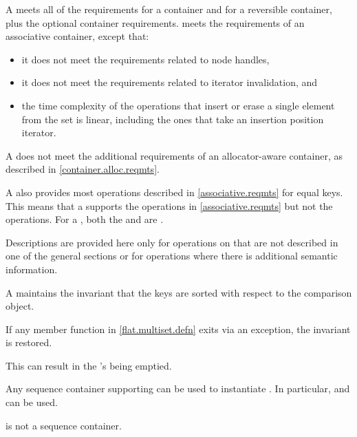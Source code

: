 \pnum
A  meets all of the requirements
for a container and
for a reversible container,
plus the optional container requirements.
 meets the requirements of
an associative container, except that:
\begin{itemize}
\item
it does not meet the requirements
related to node handles,
\item
it does not meet the requirements related to iterator invalidation, and
\item
the time complexity of the operations
that insert or erase a single element from the
set is linear,
including the ones that take an insertion position iterator.
\end{itemize}
\begin{note}
A  does not meet
the additional requirements of an allocator-aware container,
as described in \ref{container.alloc.reqmts}.
\end{note}

\pnum
A  also provides most operations
described in \ref{associative.reqmts} for equal keys.
This means that a  supports
the  operations in \ref{associative.reqmts}
but not the  operations.
For a ,
both the  and  are .

\pnum
Descriptions are provided here only for operations on 
that are not described in one of the general sections or
for operations where there is additional semantic information.

\pnum
A  maintains the invariant
that the keys are sorted with respect to the comparison object.

\pnum
If any member function in \ref{flat.multiset.defn} exits via an exception,
the invariant is restored.
\begin{note}
This can result in the 's being emptied.
\end{note}

\pnum
Any sequence container
supporting 
can be used to instantiate .
In particular,
 and  can be used.
\begin{note}
 is not a sequence container.
\end{note}


